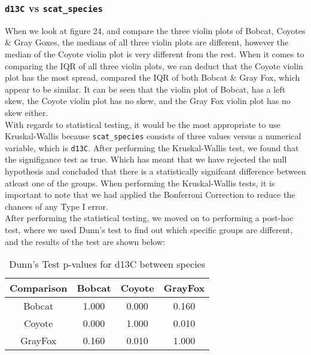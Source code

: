 \documentclass[a4paper]{article}
\begin{document}
\subsubsection{\texttt{d13C} vs \texttt{scat\_species}}
When we look at figure 24, and compare the three violin plots of Bobcat, Coyotes \& Gray Goxes, the medians of all three violin plots are different, however
the median of the Coyote violin plot is very different from the rest. When it comes to comparing the IQR of all three violin plots, we can deduct that the
Coyote violin plot has the most spread, compared the IQR of both Bobcat \& Gray Fox, which appear to be similar. It can be seen that the violin plot of 
Bobcat, has a left skew, the Coyote violin plot has no skew, and the Gray Fox violin plot has no skew either. \\

\noindent With regards to statistical testing, it would be the most appropriate to use Kruskal-Wallis because \texttt{scat\_species} consists of three values
versus a numerical variable, which is \texttt{d13C}. After performing the Kruskal-Wallis test, we found that the signifigance test as true. Which has meant 
that we have rejected the null hypothesis and concluded that there is a statistically signifcant difference between atleast one of the groups. When performing 
the Kruskal-Wallis tests, it is important to note that we had applied the Bonferroni Correction to reduce the chances of any Type I error. \\

\noindent After performing the statistical testing, we moved on to performing a post-hoc test, where we used Dunn's test to find out which specific groups are
different, and the results of the test are shown below: \\

\begin{table}[h!]
    \centering
    \begin{tabular}{|c|c|c|c|}
    \hline
    \textbf{Comparison} & \textbf{Bobcat} & \textbf{Coyote} & \textbf{GrayFox} \\
    \hline
    Bobcat & 1.000 & 0.000 & 0.160 \\
    \hline
    Coyote & 0.000 & 1.000 & 0.010 \\
    \hline
    GrayFox & 0.160 & 0.010 & 1.000 \\
    \hline
    \end{tabular}
    \caption{Dunn's Test p-values for d13C between species}
    \label{tab:dunn_d13C}
\end{table}
\end{document}

